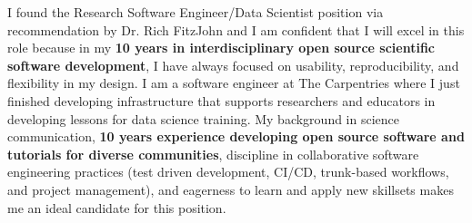 %
%
%



\vspace{1ex}

I found the Research Software Engineer/Data Scientist position via
recommendation by Dr. Rich FitzJohn and I am confident that I will excel in
this role because in my \textbf{10 years in interdisciplinary open source
scientific software development}, I have always focused on usability,
reproducibility, and flexibility in my design.
I am a software engineer at The Carpentries where I just finished developing
infrastructure that supports researchers and educators in developing lessons
for data science training. 
My background in science communication, \textbf{10 years experience developing
open source software and tutorials for diverse communities}, discipline in
collaborative software engineering practices (test driven development, CI/CD,
trunk-based workflows, and project management), and eagerness to learn and
apply new skillsets makes me an ideal candidate for this position.

